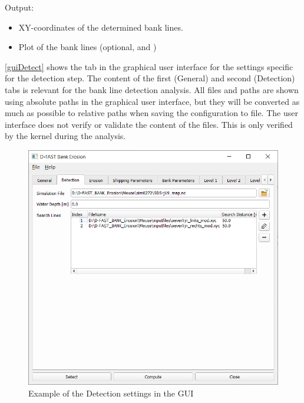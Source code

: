 Output:

\begin{itemize}
\item XY-coordinates of the determined bank lines.
\item Plot of the bank lines (optional,  and )
\end{itemize}

\autoref{guiDetect} shows the tab in the graphical user interface for the settings specific for the detection step.
The content of the first (General) and second (Detection) tabs is relevant for the bank line detection analysis.
All files and paths are shown using absolute paths in the graphical user interface, but they will be converted as much as possible to relative paths when saving the configuration to file.
The user interface does not verify or validate the content of the files.
This is only verified by the kernel during the analysis.

\begin{figure}[!b]
\center
\includegraphics[width=\textwidth]{figures/gui2.png}
\caption{Example of the Detection settings in the GUI}
\label{guiDetect}
\end{figure}

